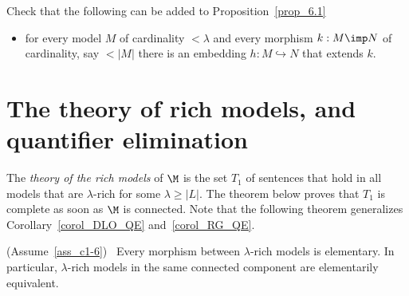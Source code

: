 \begin{exercise}
  Check that the following can be added to Proposition~\ref{prop_6.1}
  \begin{itemize}
    \item[3.] for every model $M$ of cardinality $<\lambda$ and every morphism $k:M\imp N$ of cardinality, say $<|M|$ there is an embedding $h:M\hookrightarrow N$ that extends $k$.
  \end{itemize}
\end{exercise}
\section{The theory of rich models, and quantifier elimination}

The \emph{theory of the rich models\/} of $\M$ is the set $T_1$ of sentences that hold in all models that are $\lambda$-rich for some $\lambda\ge|L|$.
The theorem below proves that $T_1$ is complete as soon as $\M$ is connected.
Note that the following theorem generalizes Corollary~\ref{corol_DLO_QE} and~\ref{corol_RG_QE}.

\begin{theorem}\label{thm_morphism_rich_elementary}
(Assume~\ref{ass_c1-6})  \  Every morphism between $\lambda$-rich models is elementary.
In particular, $\lambda$-rich models in the same connected component are elementarily equivalent.
\end{theorem}

